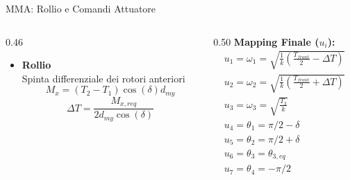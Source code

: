 \documentclass[aspectratio=169]{beamer} %
\begin{document}
\begin{frame}{MMA: Rollio e Comandi Attuatore}    
    \begin{columns}[T]
        \begin{column}{0.46\textwidth}
            \begin{itemize}
            \item \textbf{Rollio}\\
            Spinta differenziale dei rotori anteriori
            \begin{equation}
                M_x = (T_2 - T_1) \cos(\delta) d_{my}
            \end{equation}
            \begin{equation}
                \Delta T = \frac{M_{x,req}}{2 d_{my} \cos(\delta)}
            \end{equation}
            \end{itemize}
        \end{column}
        \begin{column}{0.50\textwidth}
            \textbf{Mapping Finale ($u_i$):}
            \footnotesize
            \begin{gather}
                u_1 = \omega_1 = \sqrt{\frac{1}{k} \left(\frac{T_{front}}{2} - \Delta T \right)}\\
                u_2 = \omega_2 = \sqrt{\frac{1}{k} \left(\frac{T_{front}}{2} + \Delta T \right)}\\
                u_3 = \omega_3 = \sqrt{\frac{T_3}{k}}\\
                u_4 = \theta_1 = \pi/2 - \delta\\
                u_5 = \theta_2 = \pi/2 + \delta\\
                u_6 = \theta_3 = \theta_{3,eq}\\
                u_7 = \theta_4 = -\pi/2
            \end{gather}
        
        \end{column}
    \end{columns}
    
\end{frame}
\end{document}
